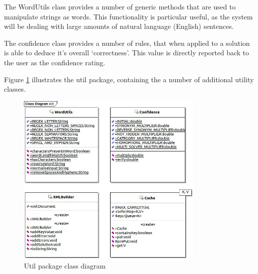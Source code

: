 The WordUtils class provides a number of generic methods that are used to 
manipulate strings as words. This functionality is particular useful, as the 
system will be dealing with large amounts of natural language (English) 
sentences.

The confidence class provides a number of rules, that when applied to a solution
is able to deduce it's overall `correctness'. This value is directly reported 
back to the user as the confidence rating.

Figure \ref{fig:util_package} illustrates the util package, containing the
a number of additional utility classes.

\begin{figure}[H]
  \centering
  \includegraphics[width=0.8\textwidth]{design/class/util.jpg}
  \caption{Util package class diagram}
  \label{fig:util_package}
\end{figure}
